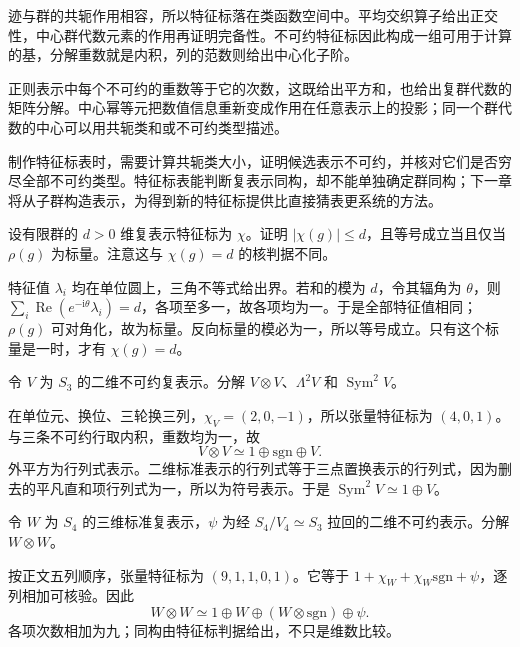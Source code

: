 \begin{chaptersummary}
	迹与群的共轭作用相容，所以特征标落在类函数空间中。平均交织算子给出正交性，中心群代数元素的作用再证明完备性。不可约特征标因此构成一组可用于计算的基，分解重数就是内积，列的范数则给出中心化子阶。

	\ProseParagraphBreak
	正则表示中每个不可约的重数等于它的次数，这既给出平方和，也给出复群代数的矩阵分解。中心幂等元把数值信息重新变成作用在任意表示上的投影；同一个群代数的中心可以用共轭类和或不可约类型描述。

	\ProseParagraphBreak
	制作特征标表时，需要计算共轭类大小，证明候选表示不可约，并核对它们是否穷尽全部不可约类型。特征标表能判断复表示同构，却不能单独确定群同构；下一章将从子群构造表示，为得到新的特征标提供比直接猜表更系统的方法。
\end{chaptersummary}

\BookExercises

\begin{exercise}\label{b5:ex:02-trace-bound}
	设有限群的 \(d>0\) 维复表示特征标为 \(\chi\)。证明 \(|\chi(g)|\le d\)，且等号成立当且仅当 \(\rho(g)\) 为标量。注意这与 \(\chi(g)=d\) 的核判据不同。
\end{exercise}
\begin{solution}
	特征值 \(\lambda_i\) 均在单位圆上，三角不等式给出界。若和的模为 \(d\)，令其辐角为 \(\theta\)，则 \(\sum_i\operatorname{Re}(e^{-\mathrm i\theta}\lambda_i)=d\)，各项至多一，故各项均为一。于是全部特征值相同；\(\rho(g)\) 可对角化，故为标量。反向标量的模必为一，所以等号成立。只有这个标量是一时，才有 \(\chi(g)=d\)。
\end{solution}

\begin{exercise}\label{b5:ex:02-s3-tensor}
	令 \(V\) 为 \(S_3\) 的二维不可约复表示。分解 \(V\otimes V\)、\(\Lambda^2V\) 和 \(\operatorname{Sym}^2V\)。
\end{exercise}
\begin{solution}
	在单位元、换位、三轮换三列，\(\chi_V=(2,0,-1)\)，所以张量特征标为 \((4,0,1)\)。与三条不可约行取内积，重数均为一，故
	\[
		V\otimes V\simeq1\oplus\mathrm{sgn}\oplus V.
	\]
	外平方为行列式表示。二维标准表示的行列式等于三点置换表示的行列式，因为删去的平凡直和项行列式为一，所以为符号表示。于是 \(\operatorname{Sym}^2V\simeq1\oplus V\)。
\end{solution}

\begin{exercise}\label{b5:ex:02-s4-tensor}
	令 \(W\) 为 \(S_4\) 的三维标准复表示，\(\psi\) 为经 \(S_4/V_4\simeq S_3\) 拉回的二维不可约表示。分解 \(W\otimes W\)。
\end{exercise}
\begin{solution}
	按正文五列顺序，张量特征标为 \((9,1,1,0,1)\)。它等于 \(1+\chi_W+\chi_W\mathrm{sgn}+\psi\)，逐列相加可核验。因此
	\[
		W\otimes W\simeq1\oplus W\oplus(W\otimes\mathrm{sgn})\oplus\psi.
	\]
	各项次数相加为九；同构由特征标判据给出，不只是维数比较。
\end{solution}

